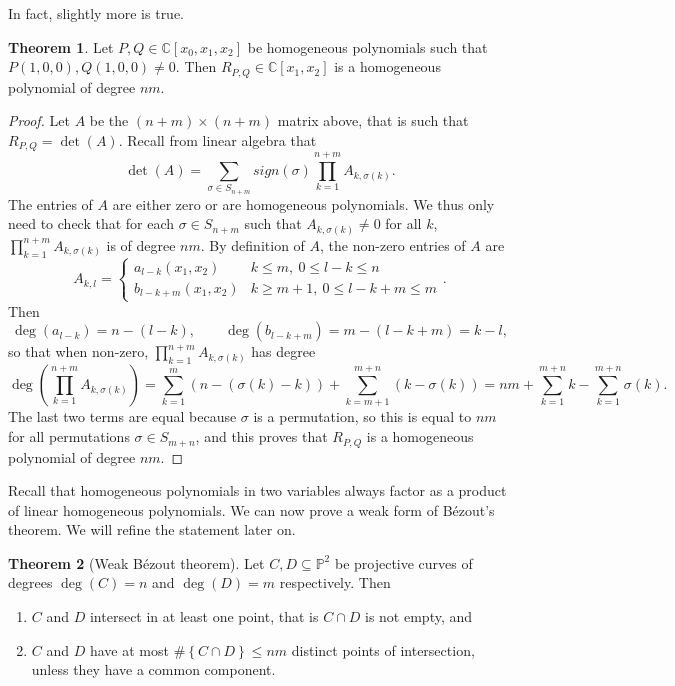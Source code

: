 \documentclass{article}
\newcommand{\C}{\mathbb{C}}
\renewcommand{\P}{\mathbb{P}}
\newcommand{\rb}[1]{\left( #1 \right)}
\renewcommand{\sb}[1]{\left[ #1 \right]}
\newcommand{\cb}[1]{\left\{ #1 \right\}}
\theoremstyle{definition}\newtheorem{definition}{Definition}[section]
\theoremstyle{definition}\newtheorem{notation}[definition]{Notation}
\theoremstyle{definition}\newtheorem{remark}[definition]{Remark}
\theoremstyle{definition}\newtheorem{example1}[definition]{Example}
\theoremstyle{definition}\newtheorem{fact}{Fact}
\theoremstyle{definition}\newtheorem{exercise}{Exercise}
\theoremstyle{definition}\newtheorem*{example2}{Example}
\newtheorem{theorem}[definition]{Theorem}
\begin{document}
In fact, slightly more is true.

\begin{theorem}
\label{thm:9.7}
Let $ P, Q \in \C\sb{x_0, x_1, x_2} $ be homogeneous polynomials such that $ P\rb{1, 0, 0}, Q\rb{1, 0, 0} \ne 0 $. Then $ R_{P, Q} \in \C\sb{x_1, x_2} $ is a homogeneous polynomial of degree $ nm $.
\end{theorem}

\begin{proof}
Let $ A $ be the $ \rb{n + m} \times \rb{n + m} $ matrix above, that is such that $ R_{P, Q} = \det\rb{A} $. Recall from linear algebra that
$$ \det\rb{A} = \sum_{\sigma \in S_{n + m}} sign\rb{\sigma}\prod_{k = 1}^{n + m}A_{k, \sigma\rb{k}}. $$
The entries of $ A $ are either zero or are homogeneous polynomials. We thus only need to check that for each $ \sigma \in S_{n + m} $ such that $ A_{k, \sigma\rb{k}} \ne 0 $ for all $ k $, $ \prod_{k = 1}^{n + m} A_{k, \sigma\rb{k}} $ is of degree $ nm $. By definition of $ A $, the non-zero entries of $ A $ are
$$ A_{k, l} = \begin{cases}
a_{l - k}\rb{x_1, x_2} & k \le m, \ 0 \le l - k \le n \\
b_{l - k + m}\rb{x_1, x_2} & k \ge m + 1, \ 0 \le l - k + m \le m
\end{cases}. $$
Then
$$ \deg\rb{a_{l - k}} = n - \rb{l - k}, \qquad \deg\rb{b_{l - k + m}} = m - \rb{l - k + m} = k - l, $$
so that when non-zero, $ \prod_{k = 1}^{n + m} A_{k, \sigma\rb{k}} $ has degree
$$ \deg\rb{\prod_{k = 1}^{n + m} A_{k, \sigma\rb{k}}} = \sum_{k = 1}^m \rb{n - \rb{\sigma\rb{k} - k}} + \sum_{k = m + 1}^{m + n} \rb{k - \sigma\rb{k}} = nm + \sum_{k = 1}^{m + n} k - \sum_{k = 1}^{m + n} \sigma\rb{k}. $$
The last two terms are equal because $ \sigma $ is a permutation, so this is equal to $ nm $ for all permutations $ \sigma \in S_{m + n} $, and this proves that $ R_{P, Q} $ is a homogeneous polynomial of degree $ nm $.
\end{proof}

Recall that homogeneous polynomials in two variables always factor as a product of linear homogeneous polynomials. We can now prove a weak form of B\'ezout's theorem. We will refine the statement later on.

\begin{theorem}[Weak B\'ezout theorem]
\label{thm:9.8}
Let $ C, D \subseteq \P^2 $ be projective curves of degrees $ \deg\rb{C} = n $ and $ \deg\rb{D} = m $ respectively. Then
\begin{enumerate}
\item $ C $ and $ D $ intersect in at least one point, that is $ C \cap D $ is not empty, and
\item $ C $ and $ D $ have at most $ \#\cb{C \cap D} \le nm $ distinct points of intersection, unless they have a common component.
\end{enumerate}
\end{theorem}
\end{document}

